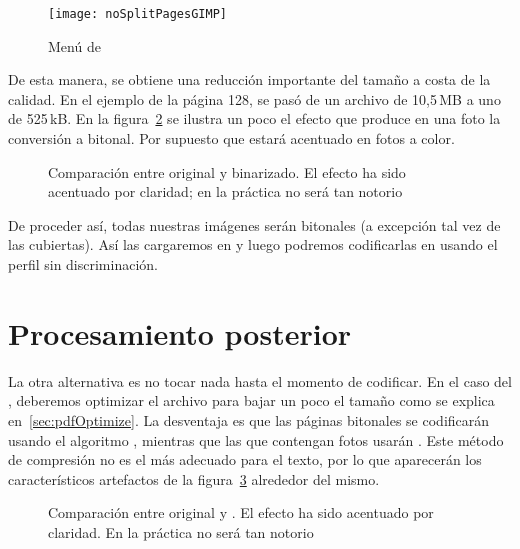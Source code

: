 \documentclass[%
	a5paper,
	10pt,
	twoside,
	openright,
	final,
]{memoir}
\begin{document}
{	\begin{figure}
		\centering
		\texttt{[image: noSplitPagesGIMP]}
		\caption[Menú \texttt{Convert Image to Indexed Colors} de \gimp]{Menú  de \gimp\label{fig:noSplitPagesGIMP}}
	\end{figure}

	De esta manera, se obtiene una reducción importante del tamaño a costa de la calidad. En el ejemplo de la página 128, se pasó de un archivo de 10,5\,MB a uno de 525\,kB. En la figura~\ref{fig:SToutputPictureZonesBitonal} se ilustra un poco el efecto que produce en una foto la conversión a bitonal. Por supuesto que estará acentuado en fotos a color.

	\begin{figure}
		\caption[Comparación entre original y binarizado.]{Comparación entre original y binarizado. El efecto ha sido acentuado por claridad; en la práctica no será tan notorio\label{fig:SToutputPictureZonesBitonal}}
	\end{figure}

	De proceder así, todas nuestras imágenes serán bitonales (a excepción tal vez de las cubiertas). Así las cargaremos en \abbyy y luego podremos codificarlas en \djvu usando el perfil  sin discriminación.

	\section{Procesamiento posterior} La otra alternativa es no tocar nada hasta el momento de codificar. En el caso del \pdf, deberemos optimizar el archivo para bajar un poco el tamaño como se explica en~\ref{sec:pdfOptimize}. La desventaja es que las páginas bitonales se codificarán usando el algoritmo \jbig, mientras que las que contengan fotos usarán \jpeg. Este método de compresión no es el más adecuado para el texto, por lo que aparecerán los característicos artefactos de la figura~\ref{fig:SToutputPictureZonesJpeg} alrededor del mismo.

	\begin{figure}
		\caption[Comparación entre original y \jpeg]{Comparación entre original y \jpeg. El efecto ha sido acentuado por claridad. En la práctica no será tan notorio\label{fig:SToutputPictureZonesJpeg}}
	\end{figure}

}
\end{document}
